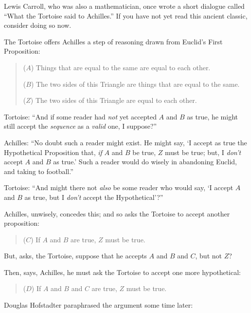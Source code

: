 \myendsectiontext


\bigskip


{
 Lewis Carroll, who was also a mathematician, once wrote a short
dialogue called ``What the Tortoise said to
Achilles.'' If you have not yet read this ancient
classic, consider doing so now. }

{
 The Tortoise offers Achilles a step of reasoning drawn from
Euclid's First Proposition:}

\begin{quotation}
{
 ($A$) Things that are equal to the same are equal to each other.}

{
 ($B$) The two sides of this Triangle are things that are equal to
the same.}

{
  ($Z$) The two sides of this Triangle are equal to each other.}
\end{quotation}

{
 Tortoise: ``And if some reader had \textit{not}
yet accepted $A$ and $B$ as true, he might still accept the
\textit{sequence} as a \textit{valid} one, I
suppose?''}

{
 Achilles: ``No doubt such a reader might exist.
He might say, `I accept as true the Hypothetical
Proposition that, \textit{if} $A$ and $B$ be true, $Z$ must be true; but, I
\textit{don't} accept $A$ and $B$ as true.'
Such a reader would do wisely in abandoning Euclid, and taking to
football.''}

{
 Tortoise: ``And might there not \textit{also} be
some reader who would say, `I accept $A$ and $B$ as true,
but I \textit{don't} accept the
Hypothetical'?''}

{
 Achilles, unwisely, concedes this; and so asks the Tortoise to
accept another proposition:}

\begin{quotation}
{
  ($C$) If $A$ and $B$ are true, $Z$ must be true.}
\end{quotation}

{
 But, asks, the Tortoise, suppose that he accepts $A$ and $B$ and $C$,
but not $Z$?}

{
 Then, says, Achilles, he must ask the Tortoise to accept one more
hypothetical:}

\begin{quotation}
{
  ($D$) If $A$ and $B$ and $C$ are true, $Z$ must be true.}
\end{quotation}

{
 Douglas Hofstadter paraphrased the argument some time later:}

